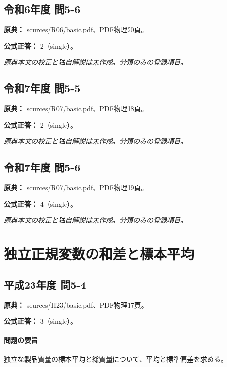 \subsection{令和6年度 問5-6}
\label{q:r06-reg-basic-5-6}

\noindent\textbf{原典：} sources/R06/basic.pdf、PDF物理20頁。

\textbf{公式正答：} 2（single）。

\par\textit{原典本文の校正と独自解説は未作成。分類のみの登録項目。}

\subsection{令和7年度 問5-5}
\label{q:r07-reg-basic-5-5}

\noindent\textbf{原典：} sources/R07/basic.pdf、PDF物理18頁。

\textbf{公式正答：} 2（single）。

\par\textit{原典本文の校正と独自解説は未作成。分類のみの登録項目。}

\subsection{令和7年度 問5-6}
\label{q:r07-reg-basic-5-6}

\noindent\textbf{原典：} sources/R07/basic.pdf、PDF物理19頁。

\textbf{公式正答：} 4（single）。

\par\textit{原典本文の校正と独自解説は未作成。分類のみの登録項目。}

\section{独立正規変数の和差と標本平均}

\subsection{平成23年度 問5-4}
\label{q:h23-reg-basic-5-4}

\noindent\textbf{原典：} sources/H23/basic.pdf、PDF物理17頁。

\textbf{公式正答：} 3（single）。

\paragraph{問題の要旨} 独立な製品質量の標本平均と総質量について、平均と標準偏差を求める。

